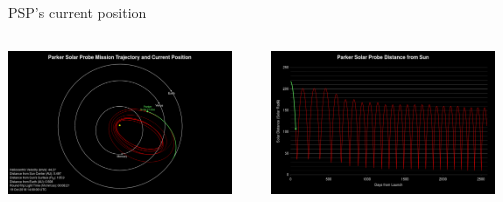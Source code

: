 \begin{frame}[c]{PSP's current position}{}
	\begin{columns}[t]	%
	
		\hspace*{-22pt}
		\includegraphics[height=0.9\textwidth]{../talk_figures/psp201810_0400_top.png}

	
		\hspace*{-10pt}
		\includegraphics[height=0.9\textwidth]{../talk_figures/psp201810_0400_bottom.png}
		
	\end{columns}
\end{frame}
